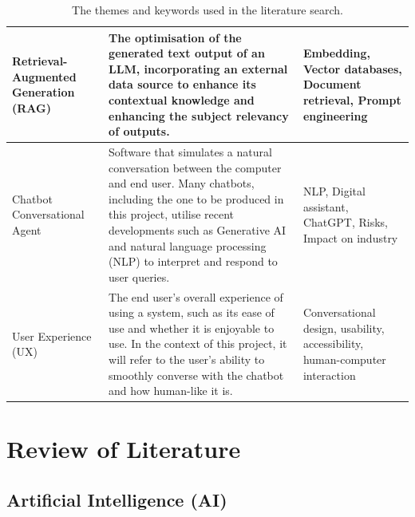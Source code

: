 \documentclass[12pt]{report}
\begin{document}
\begin{table}[H]
\begin{tabular}{|p{}|p{} | p{}|}
            \\
            \hline 

            Retrieval-Augmented Generation \newline (RAG) & The optimisation of the generated text output of an LLM, incorporating
            an external data source to enhance its contextual knowledge and enhancing the subject relevancy of outputs.
            & Embedding, Vector databases, Document retrieval, Prompt engineering\\

            \hline
            Chatbot \newline Conversational Agent & Software that simulates a natural conversation between the 
            computer and end user. Many chatbots, including the one to be produced in this project, utilise recent
            developments such as Generative AI and natural language processing (NLP) to interpret and respond to user queries.
            \autocite{IBMChatbotDef}
            & NLP, Digital assistant, ChatGPT, Risks, Impact on industry \\

            \hline

            User Experience (UX) & The end user's overall experience of using a system, such as its ease of use and 
            whether it is enjoyable to use. In the context of this project, it will refer to the user's 
            ability to smoothly converse with the chatbot and how human-like it is. 
            & Conversational design, usability, accessibility, human-computer interaction

            \\

            \hline 

        \end{tabular}
        \caption{The themes and keywords used in the literature search.}
        \label{tab:themes}
    \end{table}


    \pagebreak %

    \section{Review of Literature}

    \subsection{Artificial Intelligence (AI)}
\end{document}
